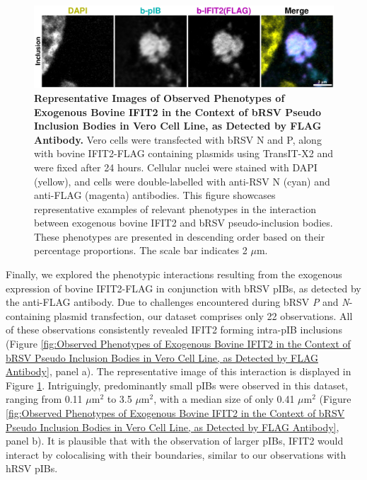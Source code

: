\begin{figure}
    \centering
    \includegraphics[width=1\linewidth]{09. Chapter 4/Figs/01. pIB/03. IFIT2/04. IFIT2-FLAG/03. FLAG/09. bi2f-bnbp.pdf}
    \caption[Representative Images of Observed Phenotypes of Exogenous Bovine IFIT2 in the Context of bRSV Pseudo Inclusion Bodies in Vero Cell Line, as Detected by FLAG Antibody.]{\textbf{Representative Images of Observed Phenotypes of Exogenous Bovine IFIT2 in the Context of bRSV Pseudo Inclusion Bodies in Vero Cell Line, as Detected by FLAG Antibody.} Vero cells were transfected with bRSV N and P, along with bovine IFIT2-FLAG containing plasmids using TransIT-X2 and were fixed after 24 hours. Cellular nuclei were stained with DAPI (yellow), and cells were double-labelled with anti-RSV N (cyan) and anti-FLAG (magenta) antibodies. This figure showcases representative examples of relevant phenotypes in the interaction between exogenous bovine IFIT2 and bRSV pseudo-inclusion bodies. These phenotypes are presented in descending order based on their percentage proportions. The scale bar indicates 2 \(\mu \mbox{m}\).}
    \label{fig:Representative Images of Observed Phenotypes of Exogenous Bovine IFIT2 in the Context of bRSV Pseudo Inclusion Bodies in Vero Cell Line, as Detected by FLAG Antibody}
\end{figure}

Finally, we explored the phenotypic interactions resulting from the exogenous expression of bovine IFIT2-FLAG in conjunction with bRSV pIBs, as detected by the anti-FLAG antibody. Due to challenges encountered during bRSV \textit{P} and \textit{N}-containing plasmid transfection, our dataset comprises only 22 observations. All of these observations consistently revealed IFIT2 forming intra-pIB inclusions (Figure \ref{fig:Observed Phenotypes of Exogenous Bovine IFIT2 in the Context of bRSV Pseudo Inclusion Bodies in Vero Cell Line, as Detected by FLAG Antibody}, panel a). The representative image of this interaction is displayed in Figure \ref{fig:Representative Images of Observed Phenotypes of Exogenous Bovine IFIT2 in the Context of bRSV Pseudo Inclusion Bodies in Vero Cell Line, as Detected by FLAG Antibody}. Intriguingly, predominantly small pIBs were observed in this dataset, ranging from 0.11 $\mu \mbox{m}^2$ to 3.5 $\mu \mbox{m}^2$, with a median size of only 0.41 $\mu \mbox{m}^2$ (Figure \ref{fig:Observed Phenotypes of Exogenous Bovine IFIT2 in the Context of bRSV Pseudo Inclusion Bodies in Vero Cell Line, as Detected by FLAG Antibody}, panel b). It is plausible that with the observation of larger pIBs, IFIT2 would interact by colocalising with their boundaries, similar to our observations with hRSV pIBs.

